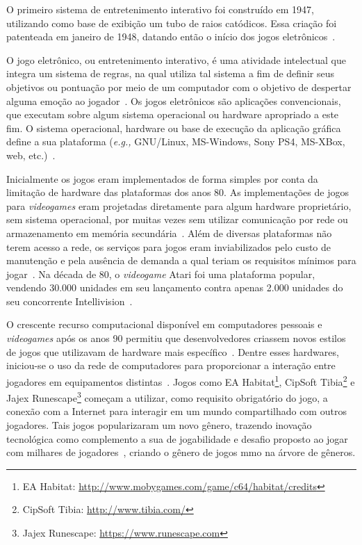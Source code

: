 O primeiro sistema de entretenimento interativo foi construído em 1947, utilizando como base de exibição um tubo de raios catódicos.
%
Essa criação foi patenteada em janeiro de 1948, datando então o início dos jogos eletrônicos~\cite{Adams2014Jan, patents1947Jan}.



O jogo eletrônico, ou entretenimento interativo, é uma atividade intelectual que integra um sistema de regras, na qual utiliza tal sistema a fim de definir seus objetivos ou pontuação por meio de um computador com o objetivo de despertar alguma emoção ao jogador~\cite{video_game_technologies}.
%
Os jogos eletrônicos são aplicações convencionais, que executam sobre algum sistema operacional ou hardware apropriado a este fim.
%
O sistema operacional, hardware ou base de execução da aplicação gráfica define a sua plataforma (\textit{e.g.,} GNU/Linux, MS-Windows, Sony PS4, MS-XBox, web, etc.)~\cite{adams_1208533}.



Inicialmente os jogos eram implementados de forma simples por conta da limitação de hardware das plataformas dos anos 80.
%
As implementações de jogos para \textit{videogames} eram projetadas diretamente para algum hardware proprietário, sem sistema operacional, por muitas vezes sem utilizar comunicação por rede ou armazenamento em memória secundária~\cite{rollings2003andrew}.
%
Além de diversas plataformas não terem acesso a rede, os serviços para jogos eram inviabilizados pelo custo de manutenção e pela ausência de demanda a qual teriam os requisitos mínimos para jogar~\cite{adams_1208533}.
%
Na década de 80, o \textit{videogame} Atari foi uma plataforma popular, vendendo 30.000 unidades em seu lançamento contra apenas 2.000 unidades do seu concorrente Intellivision~\cite{atari_age}.



O crescente recurso computacional disponível em computadores pessoais e \textit{videogames} após os anos 90 permitiu que desenvolvedores criassem novos estilos de jogos que utilizavam de hardware mais específico~\cite{adams_1208533}.
%
Dentre esses hardwares, iniciou-se o uso da rede de computadores para proporcionar a interação entre jogadores em equipamentos distintas~\cite{statisita_consumo_rede}.
%
Jogos como EA Habitat\footnote{EA Habitat: \url{http://www.mobygames.com/game/c64/habitat/credits}}, CipSoft Tibia\footnote{CipSoft Tibia: \url{http://www.tibia.com/}} e Jajex Runescape\footnote{Jajex Runescape: \url{https://www.runescape.com}} começam a utilizar, como requisito obrigatório do jogo, a conexão com a Internet para interagir em um mundo compartilhado com outros jogadores.
%
Tais jogos popularizaram um novo gênero, trazendo inovação tecnológica como complemento a sua de jogabilidade e desafio proposto ao jogar com milhares de jogadores~\cite{guinness_runescape, 1417630}, criando o gênero de jogos \ac{mmo} na árvore de gêneros.



